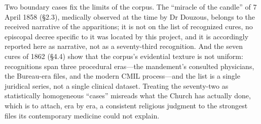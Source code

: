 Two boundary cases fix the limits of the corpus. The ``miracle of
the candle'' of 7 April 1858 (\S2.3), medically observed at the
time by Dr Douzous, belongs to the received narrative of the
apparitions; it is not on the list of recognized cures, no
episcopal decree specific to it was located by this project, and
it is accordingly reported here as narrative, not as a
seventy-third recognition. And the seven cures of 1862 (\S4.4) show
that the corpus's evidential texture is not uniform: recognitions
span three procedural eras---the mandement's consulted
physicians, the Bureau-era files, and the modern CMIL
process---and the list is a single juridical series, not a single
clinical dataset. Treating the seventy-two as statistically
homogeneous ``cases'' misreads what the Church has actually done,
which is to attach, era by era, a consistent religious judgment
to the strongest files its contemporary medicine could not
explain.
